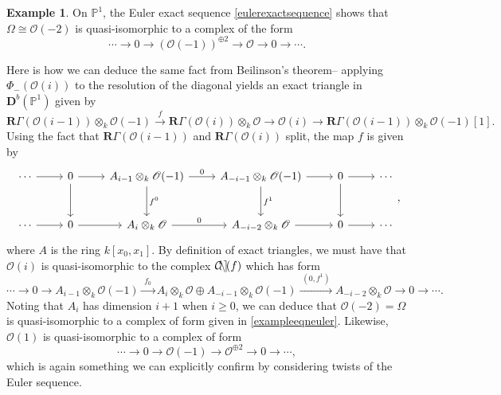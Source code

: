 \documentclass[a4paper]{article}
\theoremstyle{definition}
\newtheorem{example}[defn]{Example}
\theoremstyle{remark}
\DeclareMathOperator{\cone}{\mathcal{C\kern -2pt o \kern -2pt n \kern -2pt e
\kern -2pt}}
\newcommand{\deri}{\mathbf{D}}
\begin{document}
\begin{example}
    On \(\mathbb{P}^1\), the Euler exact sequence \eqref{eulerexactsequence}
    shows that \(\Omega \cong \mathscr{O}(-2)\) is quasi-isomorphic to a complex
    of the form 
    \begin{equation} 
        \cdots \rightarrow 0 \rightarrow (\mathscr{O}(-1))^{\oplus 2}
        \rightarrow \mathscr{O} \rightarrow 0 \rightarrow \cdots.
        \label{exampleeqneuler}
    \end{equation}

    Here is how we can deduce the same fact from Beilinson's theorem-- applying
    \(\Phi_{-}(\mathscr{O}(i))\) to the resolution of the diagonal yields an
    exact triangle in \(\deri^b(\mathbb{P}^1)\) given by
    \[\mathbf{R}\Gamma(\mathscr{O}(i-1))\otimes_k \mathscr{O}(-1) 
        \xrightarrow{f} \mathbf{R}\Gamma(\mathscr{O}(i))\otimes_k \mathscr{O}
    \rightarrow \mathscr{O}(i) \rightarrow
    \mathbf{R}\Gamma(\mathscr{O}(i-1))\otimes_k \mathscr{O}(-1) [1].\]
    Using the fact that \(\mathbf{R}\Gamma(\mathscr{O}(i-1))\) and
    \(\mathbf{R}\Gamma(\mathscr{O}(i))\) split, the map \(f\) is given by 
    \[\begin{tikzcd}[row sep = large]
        \cdots \arrow[r] 
        & 0 \arrow[r] \arrow[d] 
        & A_{i-1}\otimes_k \mathscr{O}(-1) \arrow[r,"0"] \arrow[d,"f^0"] 
        & A_{-i-1} \otimes_k \mathscr{O}(-1) \arrow[r] \arrow[d,"f^1"] 
        & 0 \arrow[r] \arrow[d] 
        &\cdots \\ 
        \cdots \arrow[r] 
        & 0 \arrow[r] 
        & A_{i}\otimes_k \mathscr{O} \arrow[r,"0"] 
        & A_{-i-2}\otimes_k \mathscr{O} \arrow[r]
        & 0 \arrow[r] 
        &\cdots 
    \end{tikzcd},\]
    where \(A\) is the ring \(k[x_0,x_1]\). By definition of exact triangles, we
    must have that \(\mathscr{O}(i)\) is quasi-isomorphic to the complex
    \(\cone(f)\) which has form
    \[\cdots \rightarrow 0 \rightarrow A_{i-1}\otimes_k \mathscr{O}(-1)
        \xrightarrow{\;f_0\;} A_{i}\otimes_k \mathscr{O} \oplus
    A_{-i-1}\otimes_k \mathscr{O}(-1) \xrightarrow{\;(0,f^1)\;} A_{-i-2}\otimes_k \mathscr{O} \rightarrow 0 \rightarrow \cdots.\]
    Noting that \(A_i\) has dimension \(i+1\) when \(i\geq 0\), we can deduce
    that \(\mathscr{O}(-2)=\Omega\) is quasi-isomorphic to a complex of form
    given in \eqref{exampleeqneuler}. Likewise, \(\mathscr{O}(1)\) is
    quasi-isomorphic to a complex of form 
    \[\cdots \rightarrow 0 \rightarrow \mathscr{O}(-1) \rightarrow
    \mathscr{O}^{\oplus 2} \rightarrow 0 \rightarrow \cdots,\]
    which is again something we can explicitly confirm by considering twists of
    the Euler sequence. \label{example-P1}
\end{example}
\end{document}
